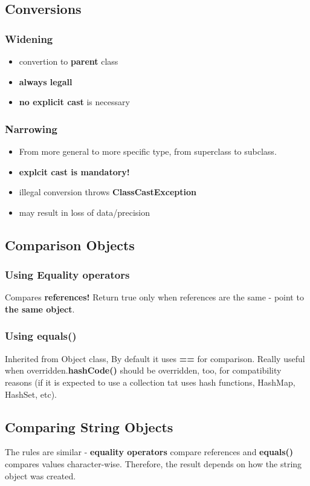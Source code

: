 \documentclass{report}
\begin{document}
\subsection{Conversions}
\subsubsection{Widening}
\begin{itemize}
	\item convertion to \textbf{parent} class
	\item \textbf{always legall}
	\item \textbf{no explicit cast} is necessary
\end{itemize}

\subsubsection{Narrowing}
\begin{itemize}
     \item From more general to more specific type, from superclass to subclass.
     \item \textbf{explcit cast is mandatory!}
     \item illegal conversion throws \textbf{ClassCastException}
     \item may result in loss of data/precision
 \end{itemize}

\subsection{Comparison Objects}
\subsubsection{Using Equality operators}
Compares \textbf{references!} Return true only when references are the same - point to \textbf{the same object}.

\subsubsection{Using equals()}
Inherited from Object class, By default it uses \textbf{== }for comparison. Really useful when overridden.\textbf{hashCode() }should be overridden, too, for compatibility reasons (if it is expected to use a collection tat uses hash functions, HashMap, HashSet, etc).

\subsection{Comparing String Objects}
The rules are similar - \textbf{equality operators} compare references and \textbf{equals()} compares values character-wise. 
Therefore, the result depends on how the string object was created.
\end{document}
